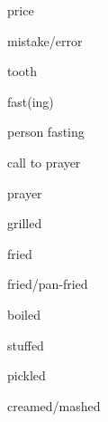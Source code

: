 \documentclass[avery5371,grid,frame]{flashcards}
\begin{document}
\begin{flashcard}{\LARGE price}
\LARGE {}
\end{flashcard}
\begin{flashcard}{\LARGE mistake/error}
\LARGE {}
\end{flashcard}
\begin{flashcard}{\LARGE tooth}
\LARGE {}
\end{flashcard}
\begin{flashcard}{\LARGE fast(ing)}
\LARGE {}
\end{flashcard}
\begin{flashcard}{\LARGE person fasting}
\LARGE {}
\end{flashcard}
\begin{flashcard}{\LARGE call to prayer}
\LARGE {}
\end{flashcard}
\begin{flashcard}{\LARGE prayer}
\LARGE {}
\end{flashcard}
\begin{flashcard}{\LARGE grilled}
\LARGE {}
\end{flashcard}
\begin{flashcard}{\LARGE fried}
\LARGE {}
\end{flashcard}
\begin{flashcard}{\LARGE fried/pan-fried}
\LARGE {}
\end{flashcard}
\begin{flashcard}{\LARGE boiled}
\LARGE {}
\end{flashcard}
\begin{flashcard}{\LARGE stuffed}
\LARGE {}
\end{flashcard}
\begin{flashcard}{\LARGE pickled}
\LARGE {}
\end{flashcard}
\begin{flashcard}{\LARGE creamed/mashed}
\LARGE {}
\end{flashcard}
\end{document}
